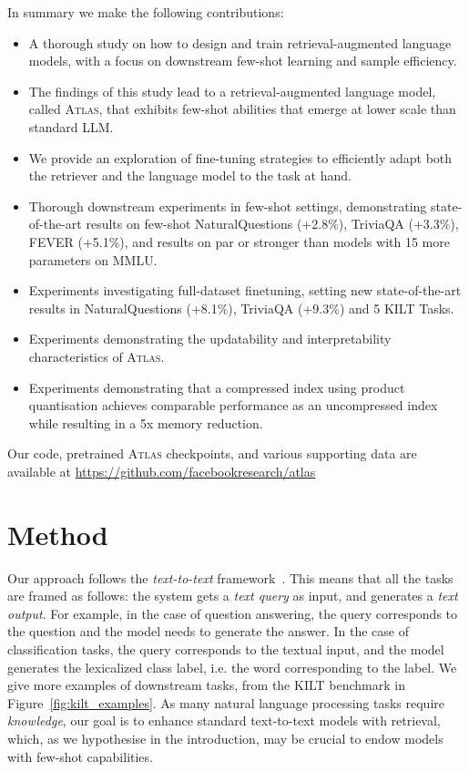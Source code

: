 \documentclass[10pt]{article} \usepackage[preprint]{tmlr}
\newcommand{\Atlas}{\textsc{Atlas}}
\begin{document}
In summary we make the following contributions:
\begin{itemize}
\itemsep0.1em 
\item A thorough study on how to design and train retrieval-augmented language models, with a focus on downstream few-shot learning and sample efficiency.
\item The findings of this study lead to a retrieval-augmented language model, called \Atlas{}, that exhibits few-shot abilities that emerge at lower scale than standard LLM.
\item We provide an exploration of fine-tuning strategies to efficiently adapt both the retriever and the language model to the task at hand.
\item Thorough downstream experiments in few-shot settings, demonstrating state-of-the-art results on few-shot NaturalQuestions (+2.8\%), TriviaQA (+3.3\%), FEVER (+5.1\%), and results on par or stronger than models with 15 more parameters on MMLU.
\item Experiments investigating full-dataset finetuning, setting new state-of-the-art results in NaturalQuestions (+8.1\%), TriviaQA (+9.3\%) and 5 KILT Tasks. 
\item Experiments demonstrating the updatability and interpretability characteristics of \Atlas.
\item Experiments demonstrating that a compressed index using product quantisation achieves comparable performance as an uncompressed index while resulting in a 5x memory reduction.
\end{itemize}

Our code, pretrained \Atlas{} checkpoints, and various supporting data are available at \url{https://github.com/facebookresearch/atlas}

\section{Method}
Our approach follows the \emph{text-to-text} framework~\citep{raffel2019exploring}.
This means that all the tasks are framed as follows: the system gets a \emph{text query} as input, and generates a \emph{text output}.
For example, in the case of question answering, the query corresponds to the question and the model needs to generate the answer.
In the case of classification tasks, the query corresponds to the textual input, and the model generates the lexicalized class label, i.e. the word corresponding to the label.
We give more examples of downstream tasks, from the KILT benchmark in Figure~\ref{fig:kilt_examples}.
As many natural language processing tasks require \emph{knowledge}, our goal is to enhance standard text-to-text models with retrieval, which, as we hypothesise in the introduction, may be crucial to endow models with few-shot capabilities. 
\end{document}
